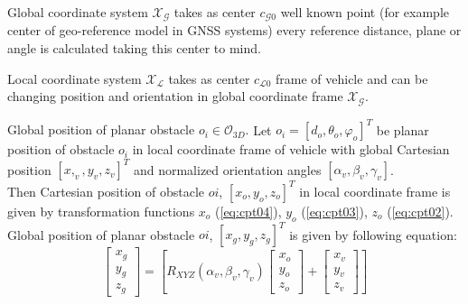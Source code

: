 \begin{definition}{Global coordinate system $\mathscr{X}_\mathscr{G}$}\label{def:globalCoordinateSystem}
    takes as center $c_{\mathscr{G}0}$ well known point (for example center of geo-reference model in GNSS systems) every reference distance, plane or angle is calculated taking this center to mind.
\end{definition}
\begin{definition}{Local coordinate system $\mathscr{X}_\mathscr{L}$}\label{def:localCoordinateSystem}
    takes as center $c_{\mathscr{L}0}$ frame of vehicle and can be changing position and orientation in global coordinate frame $\mathscr{X}_\mathscr{G}$.
\end{definition}
\begin{definition}{Global position of planar obstacle $o_i\in\mathscr{O}_{3D}$.}\label{def:globalObstaclePosition3D}
    Let $o_i = [d_o, \theta_o, \varphi_o]^T$ be planar position of obstacle $o_i$ in local coordinate frame of vehicle with global Cartesian position $[x,_v,y_v,z_v]^T$ and normalized orientation angles $[\alpha_v,\beta_v,\gamma_v]$.\\
    Then Cartesian position of obstacle $oi$, $[x_o,y_o,z_o]^T$  in local coordinate frame is given by transformation functions $x_o$ (\ref{eq:cpt04}), $y_o$ (\ref{eq:cpt03}), $z_o$ (\ref{eq:cpt02}).\\ 
    Global  position of planar obstacle $oi$, $[x_g,y_g,z_g]^T$ is given by following equation:
    \begin{equation}
        \begin{bmatrix}
            x_g\\y_g\\z_g
        \end{bmatrix}
        =
        \left [
            R_{XYZ}(\alpha_v,\beta_v,\gamma_v)
            \begin{bmatrix}
                x_o\\y_o\\z_o
            \end{bmatrix}
            +
            \begin{bmatrix}
                x_v\\y_v\\z_v
            \end{bmatrix}
        \right ]
    \end{equation}    
\end{definition}
\newpage
